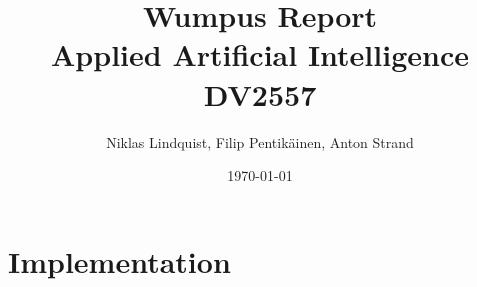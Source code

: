 \documentclass[a4paper,11pt]{article}
\begin{document}
\title{Wumpus Report \\ Applied Artificial Intelligence \\ DV2557}
\author{Niklas Lindquist, Filip Pentikäinen, Anton Strand}
\date{\today}
\maketitle

\section{Implementation}
\end{document}
